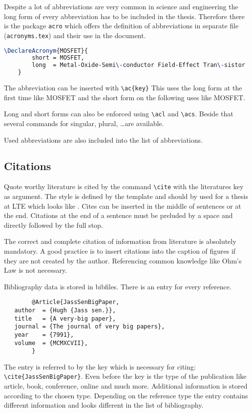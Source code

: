 	Despite a lot of abbreviations are very common in science and engineering the long form of every abbreviation has to be included in the thesis. Therefore there is the package \texttt{acro} which offers the definition of abbreviations in separate file (\texttt{acronyms.tex}) and their use in the document.
	
	\begin{lstlisting}[language=TeX]
	\DeclareAcronym{MOSFET}{
		short = MOSFET,
		long  = Metal-Oxide-Semi\-conductor Field-Effect Tran\-sistor
	}
	\end{lstlisting}

	The abbreviation can be inserted with \verb|\ac{key}| This uses the long form at the first time like \ac{MOSFET} and the short form on the following uses like \ac{MOSFET}.
	
	Long and short forms can also be enforced using \verb|\acl| and \verb|\acs|. Beside that several commands for singular, plural, \dots are available.
	
	Used abbreviations are also included into the list of abbreviations.

	\subsection{Citations}
	\label{sec:literatur}

	Quote worthy literature is cited by the command \verb|\cite| with the literatures key as argument. The style is defined by the template and should by used for a thesis at \acs{LTE} which looks like \cite{BibDEMO1}. Cites can be inserted in the middle of sentences or at the end. Citations at the end of a sentence must be preluded by a space and directly followed by the full stop.
	
	The correct and complete citation of information from literature is absolutely mandatory. A good practice is to insert citations into the caption of figures if they are not created by the author. Referencing common knowledge like Ohm's Law is not necessary.
	
	Bibliography data is stored in bibfiles. There is an entry for every reference.
	
		\begin{verbatim}
		@Article{JassSenBigPaper,
   author  = {Hugh {Jass sen.}},
   title   = {A very-big paper},
   journal = {The journal of very big papers},
   year    = {7991},
   volume  = {MCMXCVII},
		}
		\end{verbatim}
		
		The entry is referred to by the key which is necessary for citing: \verb|\cite{JassSenBigPaper}|. Even before the key is the type of the publication like article, book, conference, online and much more. Additional information is stored according to the chosen type. Depending on the reference type the entry contains different information and looks different in the list of bibliography.
		
